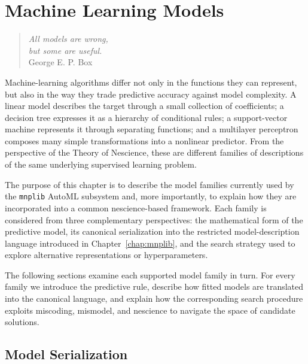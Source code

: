 %
%


\chapter{Machine Learning Models}
\label{chap:ml_models}

\begin{quote}
\begin{flushright}
\emph{All models are wrong,\\
but some are useful.}\\
George E. P. Box \\
\end{flushright}
\end{quote}
\bigskip

Machine-learning algorithms differ not only in the functions they can represent, but also in the way they trade predictive accuracy against model complexity. A linear model describes the target through a small collection of coefficients; a decision tree expresses it as a hierarchy of conditional rules; a support-vector machine represents it through separating functions; and a multilayer perceptron composes many simple transformations into a nonlinear predictor. From the perspective of the Theory of Nescience, these are different families of descriptions of the same underlying supervised learning problem.

The purpose of this chapter is to describe the model families currently used by the \texttt{mnplib} AutoML subsystem and, more importantly, to explain how they are incorporated into a common nescience-based framework. Each family is considered from three complementary perspectives: the mathematical form of the predictive model, its canonical serialization into the restricted model-description language introduced in Chapter~\ref{chap:mnplib}, and the search strategy used to explore alternative representations or hyperparameters.

The following sections examine each supported model family in turn. For every family we introduce the predictive rule, describe how fitted models are translated into the canonical language, and explain how the corresponding search procedure exploits miscoding, mismodel, and nescience to navigate the space of candidate solutions.

%
%

\section{Model Serialization}
\label{sec:mnplib_model_serialization}

